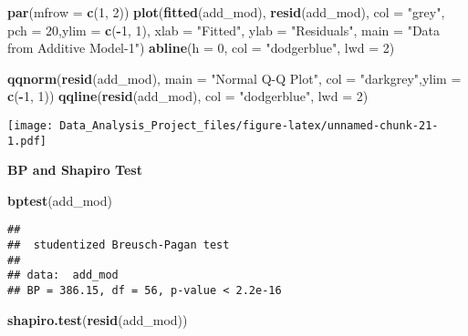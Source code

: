 \documentclass[]{article}
\newenvironment{Shaded}{\begin{snugshade}}{\end{snugshade}}
\newcommand{\KeywordTok}[1]{\textcolor[rgb]{0.13,0.29,0.53}{\textbf{#1}}}
\newcommand{\DataTypeTok}[1]{\textcolor[rgb]{0.13,0.29,0.53}{#1}}
\newcommand{\DecValTok}[1]{\textcolor[rgb]{0.00,0.00,0.81}{#1}}
\newcommand{\StringTok}[1]{\textcolor[rgb]{0.31,0.60,0.02}{#1}}
\newcommand{\OperatorTok}[1]{\textcolor[rgb]{0.81,0.36,0.00}{\textbf{#1}}}
\newcommand{\NormalTok}[1]{#1}
\begin{document}
\begin{Shaded}
\begin{Highlighting}[]
\KeywordTok{par}\NormalTok{(}\DataTypeTok{mfrow =} \KeywordTok{c}\NormalTok{(}\DecValTok{1}\NormalTok{, }\DecValTok{2}\NormalTok{))}
\KeywordTok{plot}\NormalTok{(}\KeywordTok{fitted}\NormalTok{(add_mod), }\KeywordTok{resid}\NormalTok{(add_mod), }\DataTypeTok{col =} \StringTok{"grey"}\NormalTok{, }\DataTypeTok{pch =} \DecValTok{20}\NormalTok{,}\DataTypeTok{ylim =} \KeywordTok{c}\NormalTok{(}\OperatorTok{-}\DecValTok{1}\NormalTok{, }\DecValTok{1}\NormalTok{),}
    \DataTypeTok{xlab =} \StringTok{"Fitted"}\NormalTok{, }\DataTypeTok{ylab =} \StringTok{"Residuals"}\NormalTok{, }\DataTypeTok{main =} \StringTok{"Data from Additive Model-1"}\NormalTok{)}
\KeywordTok{abline}\NormalTok{(}\DataTypeTok{h =} \DecValTok{0}\NormalTok{, }\DataTypeTok{col =} \StringTok{"dodgerblue"}\NormalTok{, }\DataTypeTok{lwd =} \DecValTok{2}\NormalTok{)}

\KeywordTok{qqnorm}\NormalTok{(}\KeywordTok{resid}\NormalTok{(add_mod), }\DataTypeTok{main =} \StringTok{"Normal Q-Q Plot"}\NormalTok{, }\DataTypeTok{col =} \StringTok{"darkgrey"}\NormalTok{,}\DataTypeTok{ylim =} \KeywordTok{c}\NormalTok{(}\OperatorTok{-}\DecValTok{1}\NormalTok{, }\DecValTok{1}\NormalTok{))}
\KeywordTok{qqline}\NormalTok{(}\KeywordTok{resid}\NormalTok{(add_mod), }\DataTypeTok{col =} \StringTok{"dodgerblue"}\NormalTok{, }\DataTypeTok{lwd =} \DecValTok{2}\NormalTok{)}
\end{Highlighting}
\end{Shaded}

\texttt{[image: Data\_Analysis\_Project\_files/figure-latex/unnamed-chunk-21-1.pdf]}

\textbf{BP and Shapiro Test }

\begin{Shaded}
\begin{Highlighting}[]
\KeywordTok{bptest}\NormalTok{(add_mod)}
\end{Highlighting}
\end{Shaded}

\begin{verbatim}
## 
##  studentized Breusch-Pagan test
## 
## data:  add_mod
## BP = 386.15, df = 56, p-value < 2.2e-16
\end{verbatim}

\begin{Shaded}
\begin{Highlighting}[]
\KeywordTok{shapiro.test}\NormalTok{(}\KeywordTok{resid}\NormalTok{(add_mod))}
\end{Highlighting}
\end{Shaded}
\end{document}
